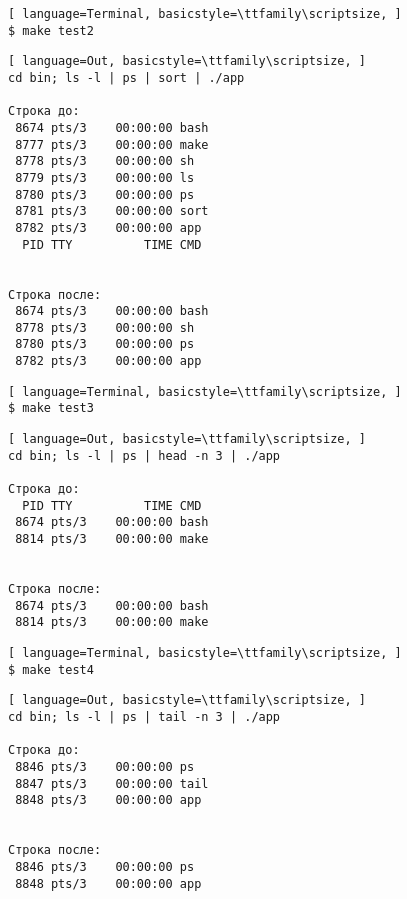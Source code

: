 \newpage


\begin{lstlisting}[ language=Terminal, basicstyle=\ttfamily\scriptsize, ]
$ make test2
\end{lstlisting}

\begin{lstlisting}[ language=Out, basicstyle=\ttfamily\scriptsize, ]
cd bin; ls -l | ps | sort | ./app

Cтрока до:
 8674 pts/3    00:00:00 bash
 8777 pts/3    00:00:00 make
 8778 pts/3    00:00:00 sh
 8779 pts/3    00:00:00 ls
 8780 pts/3    00:00:00 ps
 8781 pts/3    00:00:00 sort
 8782 pts/3    00:00:00 app
  PID TTY          TIME CMD


Строка после:
 8674 pts/3    00:00:00 bash
 8778 pts/3    00:00:00 sh
 8780 pts/3    00:00:00 ps
 8782 pts/3    00:00:00 app
\end{lstlisting}


\begin{lstlisting}[ language=Terminal, basicstyle=\ttfamily\scriptsize, ]
$ make test3
\end{lstlisting}

\begin{lstlisting}[ language=Out, basicstyle=\ttfamily\scriptsize, ]
cd bin; ls -l | ps | head -n 3 | ./app

Cтрока до:
  PID TTY          TIME CMD
 8674 pts/3    00:00:00 bash
 8814 pts/3    00:00:00 make


Строка после:
 8674 pts/3    00:00:00 bash
 8814 pts/3    00:00:00 make
\end{lstlisting}


\begin{lstlisting}[ language=Terminal, basicstyle=\ttfamily\scriptsize, ]
$ make test4
\end{lstlisting}

\begin{lstlisting}[ language=Out, basicstyle=\ttfamily\scriptsize, ]
cd bin; ls -l | ps | tail -n 3 | ./app

Cтрока до:
 8846 pts/3    00:00:00 ps
 8847 pts/3    00:00:00 tail
 8848 pts/3    00:00:00 app


Строка после:
 8846 pts/3    00:00:00 ps
 8848 pts/3    00:00:00 app
\end{lstlisting}

\newpage

